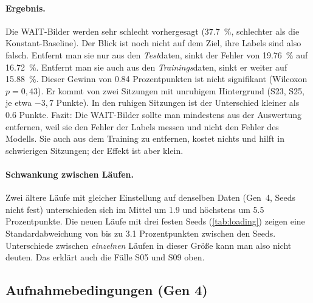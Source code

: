\paragraph{Ergebnis.} Die WAIT-Bilder werden sehr schlecht vorhergesagt
(\SI{37,7}{\percent}, schlechter als die Konstant-Baseline). Der Blick ist noch
nicht auf dem Ziel, ihre Labels sind also falsch. Entfernt man sie nur aus den
\emph{Test}daten, sinkt der Fehler von \SI{19,76}{\percent} auf
\SI{16,72}{\percent}. Entfernt man sie auch aus den \emph{Trainings}daten,
sinkt er weiter auf \SI{15,88}{\percent}. Dieser Gewinn von \num{0,84}
Prozentpunkten ist nicht signifikant (Wilcoxon $p=0,43$). Er kommt von zwei
Sitzungen mit unruhigem Hintergrund (S23, S25, je etwa $-3,7$ Punkte). In den
ruhigen Sitzungen ist der Unterschied kleiner als \num{0,6} Punkte. Fazit: Die
WAIT-Bilder sollte man mindestens aus der Auswertung entfernen, weil sie den
Fehler der Labels messen und nicht den Fehler des Modells. Sie auch aus dem
Training zu entfernen, kostet nichts und hilft in schwierigen Sitzungen; der
Effekt ist aber klein.

\paragraph{Schwankung zwischen Läufen.} Zwei ältere Läufe mit
gleicher Einstellung auf denselben Daten (Gen~4, Seeds nicht fest)
unterschieden sich im Mittel um \num{1,9} und höchstens um \num{5,5}
Prozentpunkte. Die neuen Läufe mit drei festen Seeds (\cref{tab:loading})
zeigen eine Standardabweichung von bis zu \num{3,1} Prozentpunkten zwischen den
Seeds. Unterschiede zwischen \emph{einzelnen} Läufen in dieser Größe kann man
also nicht deuten. Das erklärt auch die Fälle S05 und S09 oben.

\subsection{Aufnahmebedingungen (Gen 4)}
\label{sec:conditions}

